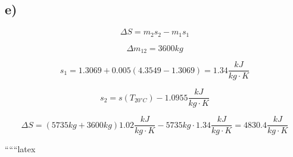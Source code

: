 

\subsection*{e)}

\[
\Delta S = m_2 s_2 - m_1 s_1
\]

\[
\Delta m_{12} = 3600 kg
\]

\[
s_1 = 1.3069 + 0.005 (4.3549 - 1.3069) = 1.34 \frac{kJ}{kg \cdot K}
\]

\[
s_2 = s(T_{20°C}) - 1.0955 \frac{kJ}{kg \cdot K}
\]

\[
\Delta S = (5735 kg + 3600 kg) 1.02 \frac{kJ}{kg \cdot K} - 5735 kg \cdot 1.34 \frac{kJ}{kg \cdot K} = 4830.4 \frac{kJ}{kg \cdot K}
\]

``````latex